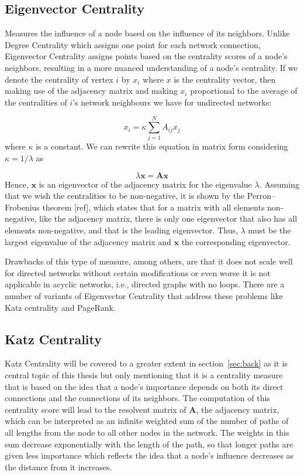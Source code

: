 \subsection*{Eigenvector Centrality} Measures the influence of a node based on the influence of its neighbors. Unlike Degree Centrality which assigns one point for each network connection, Eigenvector Centrality assigns points based on the centrality scores of a node's neighbors, resulting in a more nuanced understanding of a node's centrality. If we denote the centrality of vertex $i$ by $x_i$ where $x$ is the centrality vector, then making use of the adjacency matrix and making $x_i$ proportional to the average of the centralities of $i$’s network neighbours we have for undirected networks:

\begin{equation}
    x_i= \kappa\sum_{j=1}^{N}A_{ij}x_j
\end{equation}
where $\kappa$ is a constant. We can rewrite this equation in matrix form considering $\kappa=1/\lambda$ as

\begin{equation}
    \lambda \mathbf{x} = \mathbf{A}\mathbf{x}
\end{equation}
Hence, $\mathbf{x}$ is an eigenvector of the adjacency matrix for the eigenvalue $\lambda$. Assuming that we wish the centralities to be non-negative, it is shown by the Perron–Frobenius theorem [ref], which states that for a matrix with all elements non-negative, like the adjacency matrix, there is only one eigenvector that also has all elements non-negative, and that is the leading eigenvector. Thus, $\lambda$ must be the largest eigenvalue of the adjacency matrix and $\mathbf{x}$ the corresponding eigenvector. 

Drawbacks of this type of measure, among others, are that it does not scale well for directed networks without certain modifications or even worse it is not applicable in acyclic networks, i.e., directed graphs with no loops. There are a number of variants of Eigenvector Centrality that address these
problems like Katz centrality and PageRank.

\subsection*{Katz Centrality}
Katz Centrality will be covered to a greater extent in section~\ref{sec:back} as it is central topic of this thesis but only mentioning that it is a centrality measure that is based on the idea that a node's importance depends on both its direct connections and the connections of its neighbors. The computation of this centrality score will lead to the resolvent matrix of $\mathbf{A}$, the adjacency matrix, which can be interpreted as an infinite weighted sum of the number of paths of all lengths from the node to all other nodes in the network. The weights in this sum decrease exponentially with the length of the path, so that longer paths are given less importance which reflects the idea that a node's influence decreases as the distance from it increases. 


